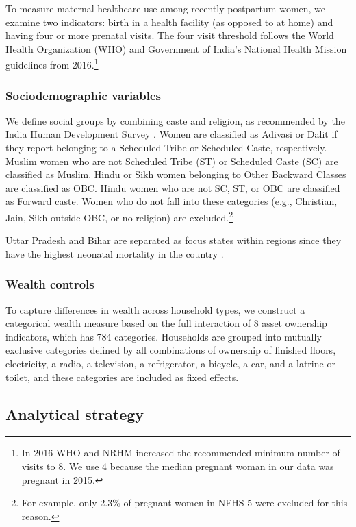\documentclass[10pt,twoside,reqno]{article}
\begin{document}
To measure maternal healthcare use among recently postpartum women, we examine two indicators: birth in a health facility (as opposed to at home) and having four or more prenatal visits. The four visit threshold follows the World Health Organization (WHO) and Government of India’s National Health Mission guidelines from 2016.\footnote{In 2016 WHO and NRHM increased the recommended minimum number of visits to 8.  We use 4 because the median pregnant woman in our data was pregnant in 2015.}

\subsubsection{Sociodemographic variables}  

We define social groups by combining caste and religion, as recommended by the India Human Development Survey \citep{desai2008india}. Women are classified as Adivasi or Dalit if they report belonging to a Scheduled Tribe or Scheduled Caste, respectively. Muslim women who are not Scheduled Tribe (ST) or Scheduled Caste (SC) are classified as Muslim. Hindu or Sikh women belonging to Other Backward Classes are classified as OBC. Hindu women who are not SC, ST, or OBC are classified as Forward caste. Women who do not fall into these categories (e.g., Christian, Jain, Sikh outside OBC, or no religion) are excluded.\footnote{For example, only 2.3\% of pregnant women in NFHS 5 were excluded for this reason.} 

Uttar Pradesh and Bihar are separated as focus states within regions since they have the highest neonatal mortality in the country \citep{coffey2025excess}. 

\subsubsection{Wealth controls} \label{sec:wealthcontrols}

To capture differences in wealth across household types, we construct a categorical wealth measure based on the full interaction of 8 asset ownership indicators, which has 784 categories. Households are grouped into mutually exclusive categories defined by all combinations of ownership of finished floors, electricity, a radio, a television, a refrigerator, a bicycle, a car, and a latrine or toilet, and these categories are included as fixed effects.

\subsection{Analytical strategy}
\end{document}
